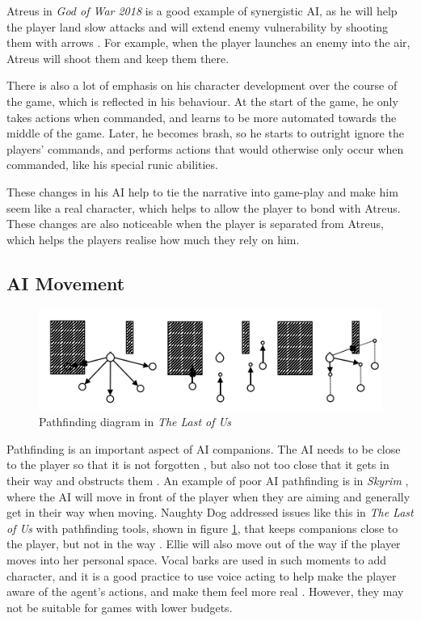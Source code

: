 \documentclass{IEEEtran}
\begin{document}
Atreus in \textit{God of War 2018} is a good example of synergistic AI, as he will help the player land slow attacks and will extend enemy vulnerability by shooting them with arrows \cite{GDCAtreus}. For example, when the player launches an enemy into the air, Atreus will shoot them and keep them there.

There is also a lot of emphasis on his character development over the course of the game, which is reflected in his behaviour. At the start of the game, he only takes actions when commanded, and learns to be more automated towards the middle of the game. Later, he becomes brash, so he starts to outright ignore the players’ commands, and performs actions that would otherwise only occur when commanded, like his special runic abilities.

These changes in his AI help to tie the narrative into game-play and make him seem like a real character, which helps to allow the player to bond with Atreus. These changes are also noticeable when the player is separated from Atreus, which helps the players realise how much they rely on him.


\subsection{AI Movement}
\label{Movement}

\begin{figure}
  \centering
  \includegraphics[width=\linewidth]{Images/IndustryResearch/TLOUPathfinding.png}
  
\caption{Pathfinding diagram in \textit{The Last of Us}}
\label{fig:TLOUPathfinding}
\end{figure}

Pathfinding is an important aspect of AI companions. The AI needs to be close to the player so that it is not forgotten \cite{GAIP2EllieAI}, but also not too close that it gets in their way and obstructs them \cite{CoupledEmpowermentMaximisation}. An example of poor AI pathfinding is in \textit{Skyrim} \cite{tremblay2013adaptive}, where the AI will move in front of the player when they are aiming and generally get in their way when moving. Naughty Dog addressed issues like this in \textit{The Last of Us} with pathfinding tools, shown in figure \ref{fig:TLOUPathfinding}, that keeps companions close to the player, but not in the way \cite{GAIP2EllieAI}. Ellie will also move out of the way if the player moves into her personal space. Vocal barks are used in such moments to add character, and it is a good practice to use voice acting to help make the player aware of the agent’s actions, and make them feel more real \cite{GMTGoodAI}. However, they may not be suitable for games with lower budgets.
\end{document}
